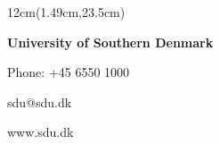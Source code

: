 \clearpage 
\thispagestyle{empty} 

\begin{textblock*}{12cm}(1.49cm,23.5cm) 

{\fontsize{12pt}{14pt}\selectfont\bfseries 
University of Southern Denmark} 

\vspace{0.90cm}

{\fontsize{12pt}{14pt}\selectfont 
Phone: +45 6550 1000\par
sdu@sdu.dk\par
www.sdu.dk}
\end{textblock*} 